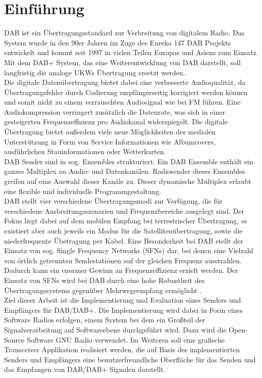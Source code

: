 \chapter{Einführung}
\label{sec:intro}
\ac{DAB} ist ein Übertragungsstandard zur Verbreitung von digitalem Radio. Das System wurde in den 90er Jahren im Zuge des Eureka 147 DAB Projekts entwickelt und kommt seit 1997 in vielen Teilen Europas und Asiens zum Einsatz. Mit dem DAB+ System, das eine Weiterentwicklung von DAB darstellt, soll langfristig die analoge \acp{UKW} Übertragung ersetzt werden.\\
Die digitale Datenübertragung bietet dabei eine verbesserte Audioqualität, da Übertragungsfehler durch Codierung empfängerseitig korrigiert werden können und somit nicht zu einem verrauschten Audiosignal wie bei FM führen. Eine Audiokompression verringert zusätzlich die Datenrate, was sich in einer gesteigerten Frequenzeffizienz pro Audiokanal widerspiegelt. Die digitale Übertragung bietet außerdem viele neue Möglichkeiten der medialen Unterstützung in Form von Service Informationen wie Albumcovers, ausführlichen Stauinformationen oder Wetterkarten.\\
DAB Sender sind in sog. Ensembles strukturiert. Ein DAB Ensemble enthält ein ganzes Multiplex an Audio- und Datenkanälen. Radiosender dieses Ensembles greifen auf eine Auswahl dieser Kanäle zu. Dieser dynamische Multiplex erlaubt eine flexible und individuelle Programmgestaltung. \\
DAB stellt vier verschiedene Übertragungsmodi zur Verfügung, die für verschiedene Ausbreitungsszenarien und Frequenzbereiche ausgelegt sind. Der Fokus liegt dabei auf dem mobilen Empfang bei terrestrischer Übertragung, es existiert aber auch jeweils ein Modus für die Satellitenübertragung, sowie die niederfrequente Übetragung per Kabel. Eine Besonderheit bei DAB stellt der Einsatz von sog. Single Frequency Networks (SFNs) dar, bei denen eine Vielzahl von örtlich getrennten Sendestationen auf der gleichen Frequenz ausstrahlen. Dadurch kann ein enormer Gewinn an Frequenzeffizienz erzielt werden. Der Einsatz von SFNs wird bei DAB durch eine hohe Robustheit des Übertragungssystems gegenüber Mehrwegeempfang ermöglicht \cite{dab_buch}.\\
Ziel dieser Arbeit ist die Implementierung und Evaluation eines Senders und Empfängers für DAB/DAB+. Die Implementierung wird dabei in Form eines Software Radios erfolgen, einem System bei dem ein Großteil der Signalverarbeitung auf Softwareebene durchgeführt wird. Dazu wird die Open-Source Software GNU Radio verwendet. Im Weiteren soll eine grafische Transceiver Applikation realisiert werden, die auf Basis des implementierten Senders und Empfängers eine benutzerfreundliche Oberfläche für das Senden und das Empfangen von DAB/DAB+ Signalen darstellt.

